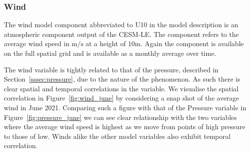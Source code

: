 
\subsubsection{Wind \label{sssec:wind}}
The wind model component abbreviated to U10 in the model description is an atmospheric component output of the CESM-LE.
The component refers to the average wind speed in $\si{\meter\per\second}$ at a height of $10\si{\meter}$.
Again the component is available on the full spatial grid and is available as a monthly average over time.

The wind variable is tightly related to that of the pressure, described in Section~\ref{sssec:pressure}, due to the nature of the phenomenon.
As such there is clear spatial and temporal correlations in the variable.
We visualise the spatial correlation in Figure~\ref{fig:wind_june} by considering a snap shot of the average wind in June 2021.
Comparing such a figure with that of the Pressure variable in Figure~\ref{fig:pressure_june} we can see clear relationship with the two variables where the average wind speed is highest as we move from points of high pressure to those of low.
Winds alike the other model variables also exhibit temporal correlation. 

